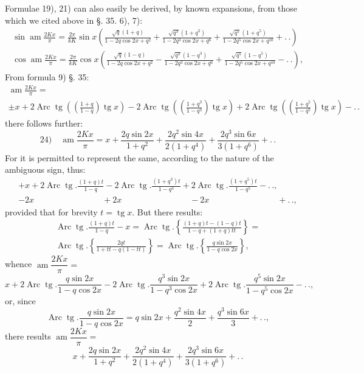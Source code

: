 \documentclass{article}
\begin{document}
Formulae 19), 21) can also easily be derived, by known expansions, from those which we cited above in §. 35. 6), 7):
\[
\begin{gathered}
\sin\operatorname{am}\frac{2Kx}{\pi}=\frac{2\pi}{kK}\sin x\left(\frac{\sqrt{q}(1+q)}{1-2q\cos2x+q^{2}}+\frac{\sqrt{q^{3}}(1+q^{3})}{1-2q^{3}\cos2x+q^{6}}+\frac{\sqrt{q^{5}}(1+q^{5})}{1-2q^{5}\cos2x+q^{10}}+.\,.\right)\\[2ex]
\cos\operatorname{am}\frac{2Kx}{\pi}=\frac{2\pi}{kK}\cos x\left(\frac{\sqrt{q}(1-q)}{1-2q\cos2x+q^{2}}-\frac{\sqrt{q^{3}}(1-q^{3})}{1-2q^{3}\cos2x+q^{6}}+\frac{\sqrt{q^{5}}(1-q^{5})}{1-2q^{5}\cos2x+q^{10}}-.\,.\right),
\end{gathered}
\]
From formula 9) §. 35:
\[
\begin{gathered}
\operatorname{am}\frac{2Kx}{\pi}=\\[1.5ex]
\pm x+2\operatorname{Arc}\operatorname{tg}\left(\left(\frac{1+q}{1-q}\right)\operatorname{tg}x\right)-2\operatorname{Arc}\operatorname{tg}\left(\left(\frac{1+q^{3}}{1-q^{3}}\right)\operatorname{tg}x\right)+2\operatorname{Arc}\operatorname{tg}\left(\left(\frac{1+q^{5}}{1-q^{5}}\right)\operatorname{tg}x\right)-.\,.
\end{gathered}
\]
there follows further:
\[
\text{24)}\quad\operatorname{am}\frac{2Kx}{\pi}=x+\frac{2q\sin2x}{1+q^{2}}+\frac{2q^{2}\sin4x}{2(1+q^{4})}+\frac{2q^{3}\sin6x}{3(1+q^{6})}+.\,.
\]
For it is permitted to represent the same, according to the nature of the ambiguous sign, thus:
\[
\begin{gathered}
+x+2\operatorname{Arc}\operatorname{tg}.\frac{(1+q)t}{1-q}-2\operatorname{Arc}\operatorname{tg}.\frac{(1+q^{3})t}{1-q^{3}}+2\operatorname{Arc}\operatorname{tg}.\frac{(1+q^{5})t}{1-q^{5}}-.\,.,\\[1.5ex]
-2x\qquad\qquad\qquad\qquad+2x\qquad\qquad\qquad\qquad-2x\qquad\qquad\qquad\qquad+.\,.,
\end{gathered}
\]
provided that for brevity $t=\operatorname{tg}x$. But there results:
\[
\begin{gathered}
\operatorname{Arc}\operatorname{tg}.\frac{(1+q)t}{1-q}-x=\operatorname{Arc}\operatorname{tg}.\left\{\frac{(1+q)t-(1-q)t}{1-q+(1+q)tt}\right\}=\\[1.5ex]
\operatorname{Arc}\operatorname{tg}.\left\{\frac{2qt}{1+tt-q(1-tt)}\right\}=\operatorname{Arc}\operatorname{tg}.\left\{\frac{q\sin2x}{1-q\cos2x}\right\},
\end{gathered}
\]
whence $\operatorname{am}\dfrac{2Kx}{\pi}=$
\[
x+2\operatorname{Arc}\operatorname{tg}.\frac{q\sin2x}{1-q\cos2x}-2\operatorname{Arc}\operatorname{tg}.\frac{q^{3}\sin2x}{1-q^{3}\cos2x}+2\operatorname{Arc}\operatorname{tg}.\frac{q^{5}\sin2x}{1-q^{5}\cos2x}-.\,.,
\]
or, since
\[
\operatorname{Arc}\operatorname{tg}.\frac{q\sin2x}{1-q\cos2x}=q\sin2x+\frac{q^{2}\sin4x}{2}+\frac{q^{3}\sin6x}{3}+.\,.,
\]
there results $\operatorname{am}\dfrac{2Kx}{\pi}=$
\[
x+\frac{2q\sin2x}{1+q^{2}}+\frac{2q^{2}\sin4x}{2(1+q^{4})}+\frac{2q^{3}\sin6x}{3(1+q^{6})}+.\,.
\]
\end{document}
